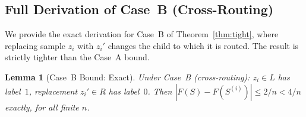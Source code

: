 \documentclass{article}
\newtheorem{lemma}[theorem]{Lemma}
\begin{document}


\subsection{Full Derivation of Case~B (Cross-Routing)}
\label{app:case-b}

We provide the exact derivation for Case~B of Theorem~\ref{thm:tight},
where replacing sample $z_i$ with $z_i'$ changes the child to which it
is routed. The result is strictly tighter than the Case~A bound.

\begin{lemma}[Case~B Bound: Exact]
\label{lem:caseB}
Under Case~B (cross-routing): $z_i \in L$ has label~$1$,
replacement $z_i' \in R$ has label~$0$.
Then $|F(S) - F(S^{(i)})| \leq 2/n < 4/n$ exactly, for all finite $n$.
\end{lemma}
\end{document}
